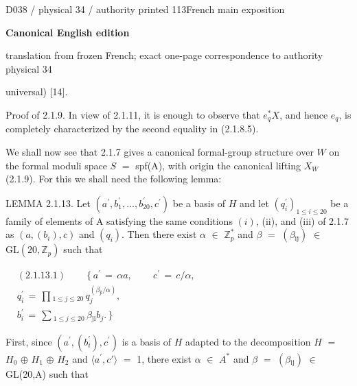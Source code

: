 \documentclass[9pt]{article}
\newcommand{\CanonText}[1]{\par{\fontsize{8.0}{9.35}\selectfont\RaggedRight #1\par}\vspace{2.2pt}}
\newenvironment{CanonMathBlock}{\par\vspace{1.2pt}\begin{center}\fontsize{6.8}{8.0}\selectfont\(\displaystyle}{\)\end{center}\vspace{1.2pt}}
\newcommand{\LayerTitle}{Canonical English edition}
\begin{document}
\noindent\begin{minipage}[t][\dimexpr\textheight-5pt\relax][t]{\textwidth}
{\sffamily\fontsize{7.3}{8.2}\selectfont\color{Quiet} D038 / physical 34 / authority printed 113\hfill French main exposition}
\par{}\vspace{4.5pt}
{\sffamily\fontsize{10.4}{11.6}\selectfont\bfseries\color{Accent} \LayerTitle}
\par{\sffamily\fontsize{6.7}{7.7}\selectfont\color{Quiet} translation from frozen French; exact one-page correspondence to authority physical 34}
\vspace{5pt}
\CanonText{universal) [14].}
\CanonText{Proof of 2.1.9. In view of 2.1.11, it is enough to observe that \(e_{q}^{*}X\), and hence \(e_{q}\), is completely characterized by the second equality in (2.1.8.5).}
\CanonText{We shall now see that 2.1.7 gives a canonical formal-group structure over \(W\) on the formal moduli space \(S\) \(=\) spf(A), with origin the canonical lifting \(X_{W}\) (2.1.9). For this we shall need the following lemma:}
\CanonText{LEMMA 2.1.13. Let \((a^{\prime},b^{\prime}_{1},\ldots{},b^{\prime}_{20},c^{\prime})\) be a basis of \(H\) and let \((q^{\prime}_{i})_{1\leq{}i\leq{}20}\) be a family of elements of A satisfying the same conditions \((i)\), (ii), and (iii) of 2.1.7 as \((a,(b_{i}),c)\) and \((q_{i})\). Then there exist \(\alpha{}\) \(\in{}\) \(\mathbb{Z}_{p}^{*}\) and \(\beta{}\) \(=\) \((\beta{}_{\mathrm{ij}})\) \(\in{}\) \(\mathrm{GL}(20,\mathbb{Z}_{p})\) such that}
\begin{CanonMathBlock}
\begin{aligned}
& (2.1.13.1)\qquad\,\lbrace{}\,a^{\prime}\,=\,\alpha{}a,\qquad\,c^{\prime}\,=\,c/\alpha{},\\
& q^{\prime}_{i}\,=\,\prod{}_{1\leq{}j\leq{}20}\,q_{j}^{(\beta{}_{\mathrm{ji}}/\alpha{})},\\
& b^{\prime}_{i}\,=\,\sum{}_{1\leq{}j\leq{}20}\,\beta{}_{\mathrm{ji}}b_{j}.\,\rbrace{}
\end{aligned}
\end{CanonMathBlock}
\CanonText{First, since \((a^{\prime},(b^{\prime}_{i}),c^{\prime})\) is a basis of \(H\) adapted to the decomposition \(H\) \(=\) \(H_{0}\) \(\oplus{}\) \(H_{1}\) \(\oplus{}\) \(H_{2}\) and \(\langle{}a^{\prime},c'\rangle{}\) \(=\) 1, there exist \(\alpha{}\) \(\in{}\) \(A^{*}\) and \(\beta{}\) \(=\) \((\beta{}_{\mathrm{ij}})\) \(\in{}\) GL(20,A) such that}

\end{minipage}
\end{document}
